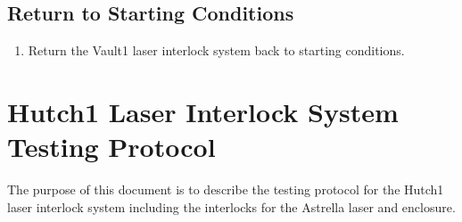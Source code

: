 \documentclass[letterpaper,10pt,english]{sphinxmanual}
\begin{document}
\subsection{Return to Starting Conditions}
\label{\detokenize{testing_documentation/Vault-1_laser:return-to-starting-conditions}}\begin{enumerate}
%
\item {} 
\sphinxAtStartPar
Return the Vault\sphinxhyphen{}1 laser interlock system back to starting conditions.

\end{enumerate}

\sphinxstepscope


\section{Hutch\sphinxhyphen{}1 Laser Interlock System Testing Protocol}
\label{\detokenize{testing_documentation/Hutch-1_laser:hutch-1-laser-interlock-system-testing-protocol}}\label{\detokenize{testing_documentation/Hutch-1_laser::doc}}
\sphinxAtStartPar
The purpose of this document is to describe the testing protocol for the Hutch\sphinxhyphen{}1 laser interlock system including the interlocks for the Astrella laser and enclosure.
\end{document}
